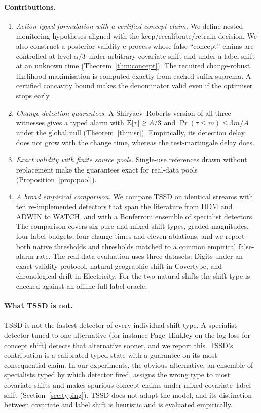 \paragraph{Contributions.}
\begin{enumerate}[leftmargin=1.4em,itemsep=0.15em]
\item \emph{Action-typed formulation with a certified concept claim.} We define nested monitoring hypotheses aligned with the keep/recalibrate/retrain decision. We also construct a posterior-validity e-process whose false ``concept'' claims are controlled at level $\alpha/3$ under arbitrary covariate shift and under a label shift at an unknown time (Theorem~\ref{thm:concept}). The required change-robust likelihood maximisation is computed exactly from cached suffix suprema. A certified concavity bound makes the denominator valid even if the optimiser stops early.
\item \emph{Change-detection guarantees.} A Shiryaev--Roberts version of all three witnesses gives a typed alarm with $\mathbb{E}[\tau]\ge A/3$ and $\Pr(\tau\le m)\le3m/A$ under the global null (Theorem~\ref{thm:sr}). Empirically, its detection delay does not grow with the change time, whereas the test-martingale delay does.
\item \emph{Exact validity with finite source pools.} Single-use references drawn without replacement make the guarantees exact for real-data pools (Proposition~\ref{prop:pool}).
\item \emph{A broad empirical comparison.} We compare TSSD on identical streams with ten re-implemented detectors that span the literature from DDM and ADWIN to WATCH, and with a Bonferroni ensemble of specialist detectors. The comparison covers six pure and mixed shift types, graded magnitudes, four label budgets, four change times and eleven ablations, and we report both native thresholds and thresholds matched to a common empirical false-alarm rate. The real-data evaluation uses three datasets: Digits under an exact-validity protocol, natural geographic shift in Covertype, and chronological drift in Electricity. For the two natural shifts the shift type is checked against an offline full-label oracle.
\end{enumerate}

\paragraph{What TSSD is not.} TSSD is not the fastest detector of every individual shift type. A specialist detector tuned to one alternative (for instance Page--Hinkley on the log loss for concept shift) detects that alternative sooner, and we report this. TSSD's contribution is a calibrated typed state with a guarantee on its most consequential claim. In our experiments, the obvious alternative, an ensemble of specialists typed by which detector fired, assigns the wrong type to most covariate shifts and makes spurious concept claims under mixed covariate--label shift (Section~\ref{sec:typing}). TSSD does not adapt the model, and its distinction between covariate and label shift is heuristic and is evaluated empirically.

